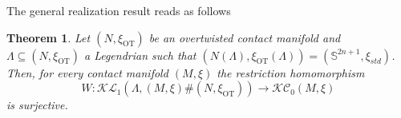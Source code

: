 \documentclass[11pt]{amsart}
\theoremstyle{plain}
\newtheorem{theorem}{Theorem}
\theoremstyle{definition}
\theoremstyle{remark}
\numberwithin{theorem}{section}
\newcommand{\Z}{\mathbb{Z}}           %
\newcommand{\NS}{{\mathbb{S}}}
\renewcommand{\L}{\mathcal{L}}           %
\newcommand{\FL}{\mathcal{FL}}           %
\newcommand{\KL}{\mathcal{KL}}
\newcommand{\KC}{\mathcal{KC}}
\newcommand{\rel}{\operatorname{rel}}
\newcommand{\C}{\operatorname{C}}
\newcommand{\FC}{\operatorname{FC}}
\newcommand{\OT}{\operatorname{OT}}
\begin{document}
The general realization result reads as follows

\begin{theorem}\label{thm:SurgeryContactomorphism}
    Let $(N,\xi_{\OT})$ be an overtwisted contact manifold and $\Lambda\subseteq (N,\xi_{\OT})$ a Legendrian such that $(N(\Lambda),\xi_{\OT}(\Lambda))=(\NS^{2n+1},\xi_{std})$. Then, for every contact manifold $(M,\xi)$ the restriction homomorphism 
    $$ W: \KL_1(\Lambda, (M,\xi)\#(N,\xi_{\OT}))\rightarrow \KC_0(M,\xi) $$
    is surjective. 
\end{theorem}











\end{document}
